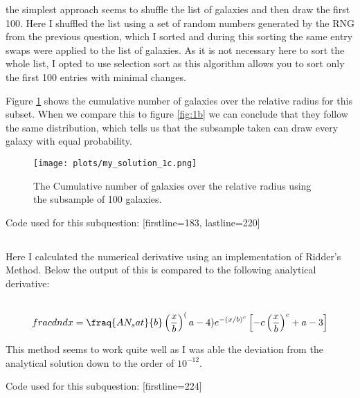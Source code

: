 the simplest approach seems to shuffle the list of galaxies and then draw the first 100.
Here I shuffled the list using a set of random numbers generated by the RNG from the previous question, which I sorted and during this sorting the same entry swaps
were applied to the list of galaxies.
As it is not necessary here to sort the whole list, I opted to use selection sort as this algorithm allows you to sort only the first 100 entries with minimal changes.

Figure \ref{fig:1c} shows the cumulative number of galaxies over the relative radius for this subset. When we compare this to figure \ref{fig:1b} we can conclude that
they follow the same distribution, which tells us that the subsample taken can draw every galaxy with equal probability.
\begin{figure}
    \centering
    \texttt{[image: plots/my\_solution\_1c.png]}
    \caption{The Cumulative number of galaxies over the relative radius using the subsample of 100 galaxies.}
    \label{fig:1c}
\end{figure}

Code used for this subquestion:
[firstline=183, lastline=220]

\subsection{}
Here I calculated the numerical derivative using an implementation of Ridder's Method.
Below the output of this is compared to the following analytical derivative:
\begin{align}
    \\frac{d n}{d x} = \fraq{A N_sat}{b} \left( \frac{x}{b} \right)^(a-4) e^{-(x/b)^c} \left[ -c \left( \frac{x}{b} \right)^c + a-3 \right]
\end{align}


This method seems to work quite well as I was able the deviation from the analytical solution down to the order of $10^{-12}$.

Code used for this subquestion:
[firstline=224]